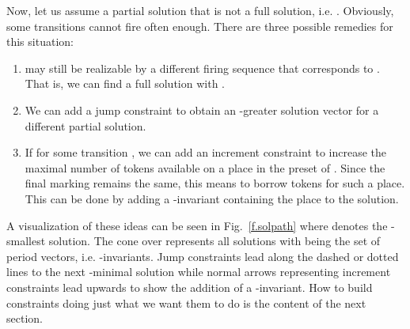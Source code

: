 \documentclass{LMCS}
\begin{document}
Now, let us assume a partial solution  that is not a full solution, i.e. .
Obviously, some transitions cannot fire often enough. There are three possible remedies for this situation:
\begin{enumerate}[(1)]
\item  may still be realizable by a different firing sequence that corresponds to . That is, we can find a full solution  with .
\item We can add a jump constraint to obtain an -greater solution vector for a different partial solution.
\item If  for some transition , we can add an increment constraint to increase the maximal number of tokens available on
	a place in the preset of . Since the final marking remains the same, this means to borrow tokens for such a place. This
	can be done by adding a -invariant containing the place to the solution. 
\end{enumerate}\smallskip

\noindent A visualization of these ideas can be seen in Fig.~\ref{f.solpath} where  denotes the -smallest solution.
The cone over  represents all solutions  with  being the set of period vectors, i.e. -invariants.
Jump constraints lead along the dashed or dotted lines to the next -minimal solution while normal arrows representing
increment constraints lead upwards to show the addition of a -invariant. How to build constraints doing just
what we want them to do is the content of the next section.
\end{document}
